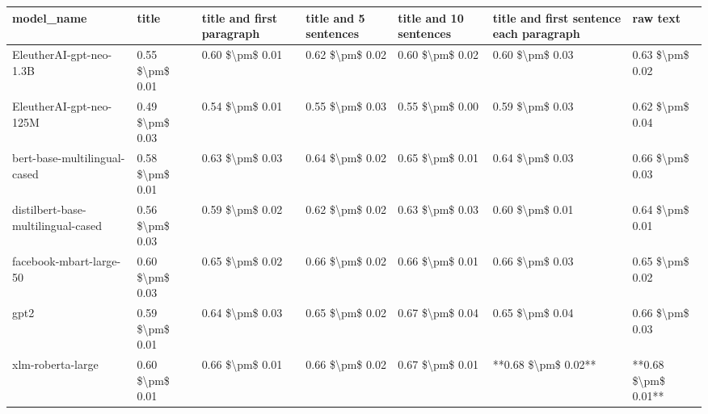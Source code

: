 \begin{tabular}{lllllll}
\toprule
                        model\_name &           title & title and first paragraph & title and 5 sentences & title and 10 sentences & title and first sentence each paragraph &            raw text \\
\midrule
           EleutherAI-gpt-neo-1.3B & 0.55 \$\textbackslash pm\$ 0.01 &           0.60 \$\textbackslash pm\$ 0.01 &       0.62 \$\textbackslash pm\$ 0.02 &        0.60 \$\textbackslash pm\$ 0.02 &                         0.60 \$\textbackslash pm\$ 0.03 &     0.63 \$\textbackslash pm\$ 0.02 \\
           EleutherAI-gpt-neo-125M & 0.49 \$\textbackslash pm\$ 0.03 &           0.54 \$\textbackslash pm\$ 0.01 &       0.55 \$\textbackslash pm\$ 0.03 &        0.55 \$\textbackslash pm\$ 0.00 &                         0.59 \$\textbackslash pm\$ 0.03 &     0.62 \$\textbackslash pm\$ 0.04 \\
      bert-base-multilingual-cased & 0.58 \$\textbackslash pm\$ 0.01 &           0.63 \$\textbackslash pm\$ 0.03 &       0.64 \$\textbackslash pm\$ 0.02 &        0.65 \$\textbackslash pm\$ 0.01 &                         0.64 \$\textbackslash pm\$ 0.03 &     0.66 \$\textbackslash pm\$ 0.03 \\
distilbert-base-multilingual-cased & 0.56 \$\textbackslash pm\$ 0.03 &           0.59 \$\textbackslash pm\$ 0.02 &       0.62 \$\textbackslash pm\$ 0.02 &        0.63 \$\textbackslash pm\$ 0.03 &                         0.60 \$\textbackslash pm\$ 0.01 &     0.64 \$\textbackslash pm\$ 0.01 \\
           facebook-mbart-large-50 & 0.60 \$\textbackslash pm\$ 0.03 &           0.65 \$\textbackslash pm\$ 0.02 &       0.66 \$\textbackslash pm\$ 0.02 &        0.66 \$\textbackslash pm\$ 0.01 &                         0.66 \$\textbackslash pm\$ 0.03 &     0.65 \$\textbackslash pm\$ 0.02 \\
                              gpt2 & 0.59 \$\textbackslash pm\$ 0.01 &           0.64 \$\textbackslash pm\$ 0.03 &       0.65 \$\textbackslash pm\$ 0.02 &        0.67 \$\textbackslash pm\$ 0.04 &                         0.65 \$\textbackslash pm\$ 0.04 &     0.66 \$\textbackslash pm\$ 0.03 \\
                 xlm-roberta-large & 0.60 \$\textbackslash pm\$ 0.01 &           0.66 \$\textbackslash pm\$ 0.01 &       0.66 \$\textbackslash pm\$ 0.02 &        0.67 \$\textbackslash pm\$ 0.01 &                     **0.68 \$\textbackslash pm\$ 0.02** & **0.68 \$\textbackslash pm\$ 0.01** \\
\bottomrule
\end{tabular}

